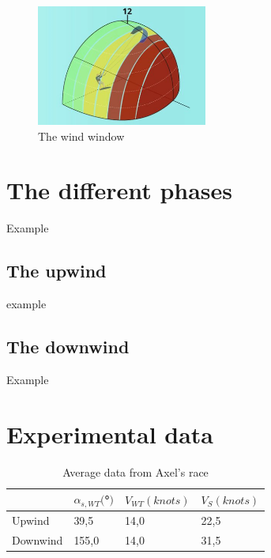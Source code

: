 \begin{figure}
\centering
    \includegraphics[width=0.5\textwidth]{figures/2D steady simulations/kite flight modeling 3.png}
    \caption{The wind window}
    \label{fig:The_wind_window}
\end{figure}

\section{The different phases}
\label{sec:Ch1.3}

Example


\subsection{The upwind}
\label{sub:Ch1.3.1}

example

\subsection{The downwind}
\label{sub:Ch1.3.1}

Example


\section{Experimental data }
\label{sec:Ch1.2}

\begin{table}[H]
    \center
    \begin{tabular}{|l|l|l|l|}
        \hline
            & $\alpha_{s, WT} ($°$) $ & $V_{WT} (knots) $ & $V_{S} (knots) $ \tabularnewline
        \hline
        Upwind & 39,5 & 14,0 & 22,5  \tabularnewline
        \hline
        Downwind & 155,0 & 14,0 & 31,5  \tabularnewline
        \hline
    \end{tabular}
    \caption{Average data from Axel's race}
    \label{tab:Average_data_from_Axels_race}
\end{table}